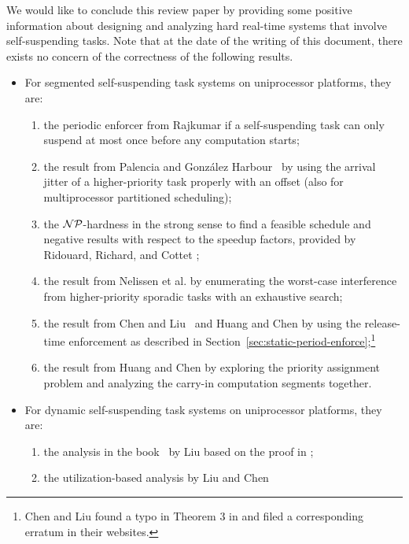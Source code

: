 We would like to conclude this review paper by providing some positive
information about designing and analyzing hard real-time systems that
involve self-suspending tasks.  Note that at the date of the writing of this
document, there exists no concern of the correctness of the following results. %
\begin{itemize}
\item For segmented self-suspending task systems on uniprocessor
  platforms, they are: 
  \begin{enumerate}
  \item the periodic enforcer from Rajkumar \cite{Raj:suspension1991}
    if a self-suspending task
    can only suspend at most once before any computation starts;
  \item the result from Palencia and Gonz\'alez
    Harbour~\cite{PH:rtss98} by using the arrival jitter of a
    higher-priority task properly with an offset (also for
    multiprocessor partitioned scheduling);
  \item the ${\cal NP}$-hardness in the strong sense to find a feasible
    schedule and negative results with respect to the speedup factors,
    provided by Ridouard, Richard, and Cottet \cite{Ridouard_2004};
  \item the result from Nelissen et al. \cite{ecrts15nelissen} by
    enumerating the worst-case interference from higher-priority
    sporadic tasks with an exhaustive search;
  \item the result from Chen and Liu~\cite{RTSS-ChenL14} and Huang and
    Chen \cite{WC16-suspend-DATE} by using the release-time
    enforcement as described in
    Section~\ref{sec:static-period-enforce};\footnote{Chen and Liu
      found a typo in Theorem 3 in \cite{RTSS-ChenL14}
      and filed a corresponding erratum in their websites.}
  \item the result from Huang and Chen \cite{Huang:multiseg} by
    exploring the priority assignment problem and analyzing the
    carry-in computation segments together.
  \end{enumerate}
\item For dynamic self-suspending task systems on uniprocessor
  platforms, they are:
  \begin{enumerate}
  \item the analysis in the book~\cite[Pages
    164-165]{Liu:2000:RS:518501} by Liu based on the proof in \cite{ChenHuangNelissen}; 
  \item the utilization-based analysis by Liu and Chen

\end{enumerate}
\end{itemize}
